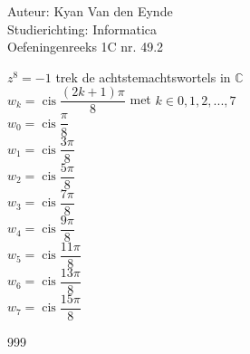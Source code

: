 \documentclass[a4paper]{article}
\newcommand{\cis}{\operatorname{cis}}
\begin{document}
  
\noindent \large Auteur: Kyan Van den Eynde \\
\noindent \large Studierichting: Informatica\\
\noindent \large Oefeningenreeks 1C nr. 49.2\\

\medskip

\normalsize

$z^8 = -1$ trek de achtstemachtswortels in $\mathbb{C}$\\

$w_k = \cis \dfrac{(2k+1)\pi}{8}$ met $k \in {0,1,2,...,7}$\\

$w_0 = \cis \dfrac{\pi}{8}$\\

$w_1 = \cis \dfrac{3\pi}{8}$\\

$w_2 = \cis \dfrac{5\pi}{8}$\\

$w_3 = \cis \dfrac{7\pi}{8}$\\

$w_4 = \cis \dfrac{9\pi}{8}$\\

$w_5 = \cis \dfrac{11\pi}{8}$\\

$w_6 = \cis \dfrac{13\pi}{8}$\\

$w_7 = \cis \dfrac{15\pi}{8}$\\

\begin{thebibliography}{999}
\end{thebibliography}
\end{document}
